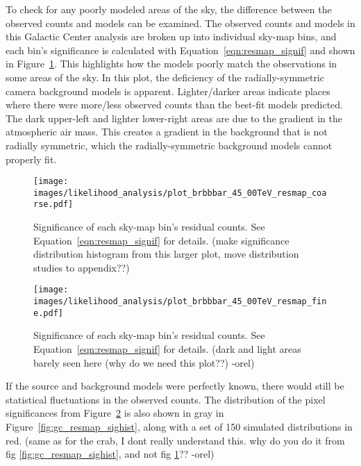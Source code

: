   To check for any poorly modeled areas of the sky, the difference between the observed counts and models can be examined.
  The observed counts and models in this Galactic Center analysis are broken up into individual sky-map bins, and each bin's significance is calculated with Equation~\ref{eqn:resmap_signif} and shown in Figure~\ref{fig:gc_resmap}.
  This highlights how the models poorly match the observations in some areas of the sky.
  In this plot, the deficiency of the radially-symmetric camera background models is apparent.
  Lighter/darker areas indicate places where there were more/less observed counts than the best-fit models predicted.
  The dark upper-left and lighter lower-right areas are due to the gradient in the atmospheric air mass.
  This creates a gradient in the background that is not radially symmetric, which the radially-symmetric background models cannot properly fit.
  
  \begin{figure}[ht]
    \centering
    \texttt{[image: images/likelihood\_analysis/plot\_brbbbar\_45\_00TeV\_resmap\_coarse.pdf]}
    \caption[Galactic Center Residual Map Coarse Binning]
    {
      Significance of each sky-map bin's residual counts.
      See Equation~\ref{eqn:resmap_signif} for details.
      {\color{red}(make significance distribution histogram from this larger plot, move distribution studies to appendix??)}
    }
    \label{fig:gc_resmap}
  \end{figure}
  
  \begin{figure}[ht]
    \centering
    \texttt{[image: images/likelihood\_analysis/plot\_brbbbar\_45\_00TeV\_resmap\_fine.pdf]}
    \caption[Galactic Center Residual Map Fine Binning]
    {
      Significance of each sky-map bin's residual counts.
      See Equation~\ref{eqn:resmap_signif} for details.
      {\color{red}(dark and light areas barely seen here (why do we need this plot??) -orel)}
    }
    \label{fig:gc_resmap_fine}
  \end{figure}
  
  If the source and background models were perfectly known, there would still be statistical fluctuations in the observed counts.
  The distribution of the pixel significances from Figure~\ref{fig:gc_resmap_fine} is also shown in gray in Figure~\ref{fig:gc_resmap_sighist}, along with a set of 150 simulated distributions in red.
  {\color{red}(same as for the crab, I dont really understand this.  why do you do it from fig \ref{fig:gc_resmap_sighist}, and not fig \ref{fig:gc_resmap}?? -orel)}
  
